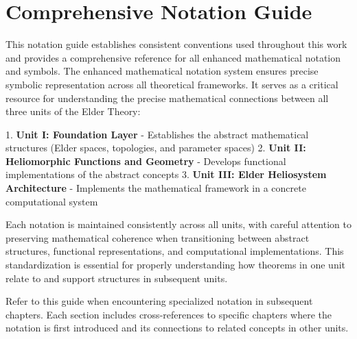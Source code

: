 \chapter*{Comprehensive Notation Guide}
\label{chap:notation_guide}

This notation guide establishes consistent conventions used throughout this work and provides a comprehensive reference for all enhanced mathematical notation and symbols. The enhanced mathematical notation system ensures precise symbolic representation across all theoretical frameworks. It serves as a critical resource for understanding the precise mathematical connections between all three units of the Elder Theory: 

1. \textbf{Unit I: Foundation Layer} - Establishes the abstract mathematical structures (Elder spaces, topologies, and parameter spaces)
2. \textbf{Unit II: Heliomorphic Functions and Geometry} - Develops functional implementations of the abstract concepts
3. \textbf{Unit III: Elder Heliosystem Architecture} - Implements the mathematical framework in a concrete computational system

Each notation is maintained consistently across all units, with careful attention to preserving mathematical coherence when transitioning between abstract structures, functional representations, and computational implementations. This standardization is essential for properly understanding how theorems in one unit relate to and support structures in subsequent units.

Refer to this guide when encountering specialized notation in subsequent chapters. Each section includes cross-references to specific chapters where the notation is first introduced and its connections to related concepts in other units.

\newpage
